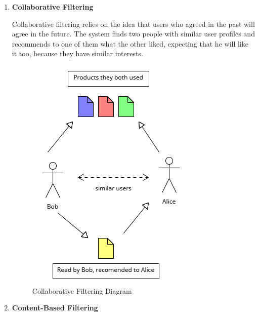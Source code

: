 \documentclass[10pt,twoside,slovak,a4paper]{article}
\begin{document}
\begin{enumerate}
\item  \textbf{Collaborative Filtering}

Collaborative filtering relies on the idea that users who agreed in the past will agree in the future. The system finds two people with similar user profiles and recommends to one of them what the other liked, expecting that he will like it too, because they have similar interests.
\begin{figure}[!h]
    \centering
    \includegraphics[width=0.8\linewidth]{Diagram 3.png}
    \caption{Collaborative Filtering Diagram}
    \label{fig:collaborative}
\end{figure}

\newpage
\item  \textbf{Content-Based Filtering}


\end{enumerate}
\end{document}
